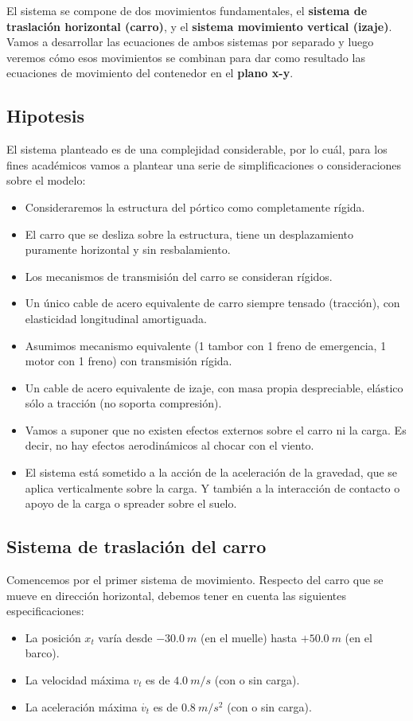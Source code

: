 \documentclass[11pt]{article}
\begin{document}
El sistema se compone de dos movimientos fundamentales, el \textbf{sistema de traslación horizontal (carro)}, y el \textbf{sistema movimiento vertical (izaje)}. Vamos a desarrollar las ecuaciones de ambos sistemas por separado y luego veremos cómo esos movimientos se combinan para dar como resultado las ecuaciones de movimiento del contenedor en el \textbf{plano x-y}.

\subsection{Hipotesis}
El sistema planteado es de una complejidad considerable, por lo cuál, para los fines académicos vamos a plantear una serie de simplificaciones o consideraciones sobre el modelo:
\begin{itemize}
	\item Consideraremos la estructura del pórtico como completamente rígida.
	\item El carro que se desliza sobre la estructura, tiene un desplazamiento puramente horizontal y sin resbalamiento.
	\item Los mecanismos de transmisión del carro se consideran rígidos.
	\item Un único cable de acero equivalente de carro siempre tensado (tracción), con elasticidad longitudinal amortiguada.
	\item Asumimos mecanismo equivalente (1 tambor con 1 freno de emergencia, 1 motor con 1 freno) con transmisión rígida.
	\item Un cable de acero equivalente de izaje, con masa propia despreciable, elástico sólo a tracción (no soporta compresión).
	\item Vamos a suponer que no existen efectos externos sobre el carro ni la carga. Es decir, no hay efectos aerodinámicos al chocar con el viento.
	\item El sistema está sometido a la acción de la aceleración de la gravedad, que se aplica verticalmente sobre la carga. Y también a la interacción de contacto o apoyo de la carga o spreader sobre el suelo.
\end{itemize}

\subsection{Sistema de traslación del carro}
\label{section:carro}

Comencemos por el primer sistema de movimiento. Respecto del carro que se mueve en dirección horizontal, debemos tener en cuenta las siguientes especificaciones:
\begin{itemize}
	\item La posición $x_{t}$ varía desde $-30.0\ m$ (en el muelle) hasta $+50.0\ m$ (en el barco).
	\item La velocidad máxima $v_{t}$ es de $4.0\ m/s$ (con o sin carga).
	\item La aceleración máxima $\dot{v_{t}}$ es de $0.8\ m/s^{2}$ (con o sin carga).
\end{itemize}
\end{document}
